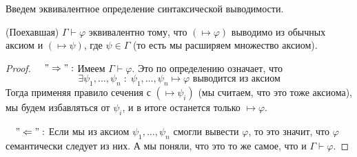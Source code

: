 \vspace{3mm}

Введем эквивалентное определение синтаксической выводимости.

\begin{theorem} (Поехавшая)
    $\Gamma \vdash \varphi$ эквивалентно тому, что $(\mapsto \varphi)$ выводимо из обычных аксиом и $(\mapsto \psi)$, где $\psi \in \Gamma$ (то есть мы расширяем множество аксиом).
\end{theorem}
\begin{proof} \quad

    $\quad "\Rightarrow":$ Имеем $\Gamma \vdash \varphi$. Это по определению означает, что \[ \exists \psi_1, \dots, \psi_n \; : \; \psi_1, \dots, \psi_n \mapsto \varphi \text{ выводится из аксиом} \]
    \quad\quad Тогда применяя правило сечения с $(\mapsto \psi_i)$ (мы считаем, что это тоже аксиома), мы будем избавляться от $\psi_i$, и в итоге останется только $\mapsto \varphi$.

    $\quad "\Leftarrow":$ Если мы из аксиом $\psi_1, \dots, \psi_n$ смогли вывести $\varphi$, то это значит, что $\varphi$ семантически следует из них. А мы поняли, что это то же самое, что и $\Gamma \vdash \varphi$.
\end{proof}
